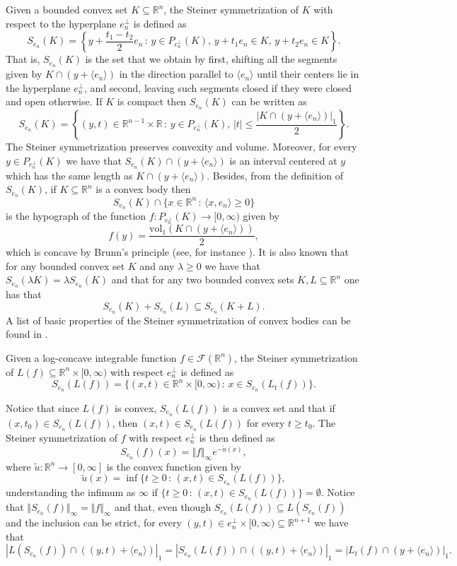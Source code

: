 \documentclass{amsart}
\newcommand{\R}{\mathbb R}
\theoremstyle{remark}
\theoremstyle{definition}
\def\vol{\mathrm{vol}}
\numberwithin{equation}{section}
\begin{document}
Given a bounded convex set $K\subseteq\R^n$, the Steiner symmetrization of $K$ with respect to the hyperplane $e_n^\perp$ is defined as
$$
S_{e_n}(K)=\left\{y+\frac{t_1-t_2}{2}e_n\,:\,y\in P_{e_n^\perp}(K),\,y+t_1e_n\in K,\,y+t_2e_n\in K\right\}.
$$
That is, $S_{e_n}(K)$ is the set that we obtain by first, shifting all the segments given by $K\cap(y+\langle e_n\rangle)$ in the direction parallel to $\langle e_n\rangle$ until their centers lie in the hyperplane $e_n^\perp$, and second, leaving such segments closed if they were closed and open otherwise. If $K$ is compact then $S_{e_n}(K)$ can be written as
$$
S_{e_n}(K)=\left\{(y,t)\in\R^{n-1}\times\R\,:\,y\in P_{e_n^\perp}(K),\,|t|\leq\frac{|K\cap(y+\langle e_n\rangle)|_1}{2}\right\}.
$$
The Steiner symmetrization preserves convexity and volume. Moreover, for every $y\in P_{e_n^\perp}(K)$ we have that $S_{e_n}(K)\cap(y+\langle e_n\rangle)$ is an interval centered at $y$ which has the same length as $K\cap(y+\langle e_n\rangle)$. Besides, from the definition of $S_{e_n}(K)$, if $K\subseteq\R^n$ is a convex body then
$$
S_{e_n}(K)\cap\{x\in\R^n\,:\,\langle x,e_n\rangle\geq0\}
$$
is the hypograph of the function $f:P_{e_n^\perp}(K)\to[0,\infty)$ given by $$f(y)=\frac{\vol_1(K\cap(y+\langle e_n\rangle))}{2},$$ which is concave by Brunn's principle (see, for instance \cite[Thm. 1.2.2]{BGVV}). It is also known that for any bounded convex set $K$ and any $\lambda\geq0$ we have that  $S_{e_n}(\lambda K)=\lambda S_{e_n}(K)$ and that for any two bounded convex sets $K,L\subseteq\R^n$ one has that
\begin{equation}\label{eq:SteinerSymmetrizationInclusion}
S_{e_n}(K)+S_{e_n}(L)\subseteq S_{e_n}(K+L).
\end{equation}
A list of basic properties of the Steiner symmetrization of convex bodies can be found in \cite[Sect. 1.1.7 and A.5]{AGM}.

Given a log-concave integrable function $f\in\mathcal{F}(\R^n)$, the Steiner symmetrization of $L(f)\subseteq\R^n\times[0,\infty)$ with respect $e_n^\perp$ is defined as
$$
S_{e_n}(L(f))=\{(x,t)\in\R^n\times[0,\infty)\,:\, x\in S_{e_n}(L_t(f))\}.
$$

Notice that since $L(f)$ is convex, $S_{e_n}(L(f))$ is a convex set and that if $(x,t_0)\in S_{e_n}(L(f))$, then $(x,t)\in S_{e_n}(L(f))$ for every $t\geq t_0$. The Steiner symmetrization of $f$ with respect $e_n^\perp$ is then defined as
$$
S_{e_n}(f)(x)=\Vert f\Vert_\infty e^{-\tilde{u}(x)},
$$
where $\tilde{u}:\R^n\to[0,\infty]$ is the convex function given by
$$
\tilde{u}(x)=\inf\{t\geq0\,:\, (x,t)\in S_{e_n}(L(f))\},
$$
understanding the infimum as $\infty$ if $\{t\geq0\,:\, (x,t)\in S_{e_n}(L(f))\}=\emptyset$. Notice that $\Vert S_{e_n}(f)\Vert_\infty=\Vert{f}\Vert_{\infty}$ and that, even though $S_{e_n}(L(f))\subseteq L(S_{e_n}(f))$ and the inclusion can be strict, for every $(y,t)\in e_n^\perp\times[0,\infty)\subseteq\R^{n+1}$ we have that
$$
|L(S_{e_n}(f))\cap ((y,t)+\langle e_n\rangle)|_1=|S_{e_n}(L(f))\cap ((y,t)+\langle e_n\rangle)|_1=|L_t(f)\cap (y+\langle e_n\rangle)|_1.
$$
\end{document}
